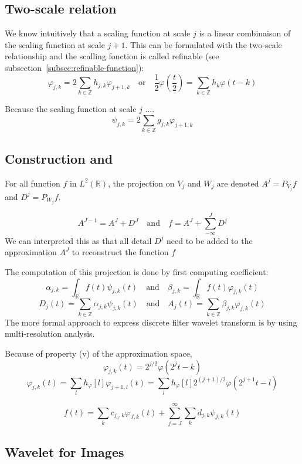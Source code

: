 \documentclass[twocolumn]{article}
\numberwithin{equation}{section}
\begin{document}
		\subsection{Two-scale relation}
We know intuitively that a scaling function at scale $j$ is a linear combinaison of the scaling function at scale $j+1$. This can be formulated with the two-scale relationship and the scalling fonction is called refinable (see subsection~\ref{subsec:refinable-function}):
$$\varphi_{j,k}=2\sum_{k\in \mathbb{Z}}h_{j,k} \varphi_{j+1,k} \quad \text{or}\quad \frac{1}{2}\varphi\left(\frac{t}{2}\right)=\sum_{k\in \mathbb{Z}}h_k \varphi(t-k)$$

Because the scaling function at scale $j$ ....
$$\psi_{j,k}=2\sum_{k\in \mathbb{Z}}g_{j,k} \varphi_{j+1,k}$$
		\subsection{Construction and }
		
For all function $f$ in $L^2(\mathbb R)$, the projection on $V_j$ and $W_j$ are denoted $A^j=P_{V_j}f$ and $D^j=P_{W_j}f$.

$$A^{J-1}=A^J +D^J \quad \text{and} \quad f=A^J + \sum_{-\infty}^J D^j$$
We can interpreted this as that all detail $D^j$ need to be added to the approximation $A^J$ to reconstruct the function $f$

The computation of this projection is done by first computing coefficient:
$$\alpha_{j,k}=\int_\mathbb{R} f(t) \psi_{j,k}(t) \quad \text{and} \quad \beta_{j,k}=\int_\mathbb{R} f(t) \varphi_{j,k}(t)$$
$$D_j(t)=\sum_{k \in \mathbb{Z}} \alpha_{j,k} \psi_{j,k}(t) \quad \text{and} \quad A_j(t)=\sum_{k \in \mathbb{Z}} \beta_{j,k} \varphi_{j,k}(t)$$
The more formal approach to express discrete filter wavelet transform is by using multi-resolution analysis.




Because of property (v) of the approximation space, 
$$\varphi_{j,k}(t)=2^{j/2}\varphi(2^j t-k) $$
$$\varphi_{j,k}(t) =\sum_l h_{\varphi}[l] \varphi_{j+1,l}(t)=\sum_l h_{\varphi}[l] 2^{(j+1)/2} \varphi(2^{j+1}t-l)$$

$$f(t)=\sum_k c_{j_0,k}\varphi_{J,k}(t)+\sum_{j=J}^{\infty} \sum_k d_{j,k}\psi_{j,k}(t)$$



		\subsection{Wavelet for Images}


	
\end{document}
